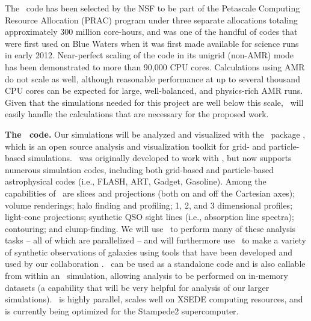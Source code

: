 The \enzo\ code has been selected by the NSF to be part of the
Petascale Computing Resource Allocation (PRAC) program under three
separate allocations totaling approximately 300 million core-hours, and was one of
the handful of codes that were first used on Blue Waters when it was
first made available for science runs in early 2012.  Near-perfect
scaling of the code in its unigrid (non-AMR) mode has  been
demonstrated to more than 90,000 CPU cores.  Calculations using AMR do
not scale as well, although reasonable performance at up to several
thousand CPU cores can be expected for large, well-balanced, and
physics-rich AMR runs.  Given that the simulations needed for this
project are well below this scale, \enzo\ will easily handle the
calculations that are necessary for the proposed work.


\vspace{2mm}
\noindent
{\large \textbf{The \yt\ code.}}
Our simulations will be analyzed and visualized with the \yt\ package
\cite[][\url{http://yt-project.org}]{Turk11}, which is an open source
analysis and visualization toolkit for grid- and particle-based
simulations.  \yt\ was originally developed to work with \enzo, but
now supports numerous simulation codes, including both grid-based and
particle-based astrophysical codes (i.e., FLASH, ART, Gadget,
Gasoline).  Among the capabilities of \yt\ are slices and projections
(both on and off the Cartesian axes); volume renderings; halo finding
and profiling; 1, 2, and 3 dimensional profiles; light-cone
projections; synthetic QSO sight lines (i.e., absorption line spectra);
contouring; and clump-finding.  We will use \yt\ to perform many of
these analysis tasks -- all of which are parallelized -- and will
furthermore use \yt\ to make a variety of synthetic observations of
galaxies using tools that have been developed and used by our
collaboration \citep[e.g.,][]{Barrow17,Barrow17_FL2}.  \yt\ can be 
used as a standalone code and is also
callable from within an \enzo\ simulation, allowing analysis to be
performed on in-memory datasets (a capability that will be very
helpful for analysis of our larger simulations).  \yt\ is highly
parallel, scales well on XSEDE computing resources, and is currently
being optimized for the Stampede2 supercomputer.

